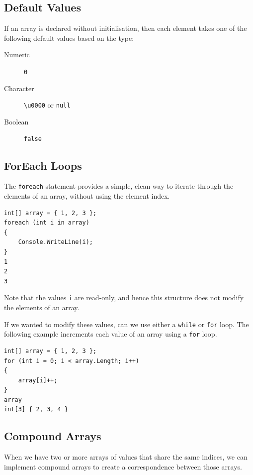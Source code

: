 \documentclass{article}
\def\customlinemarker#1#2{
    \edef\thelstnumber{%
        \unexpanded{%
            \ifnum#1=\value{lstnumber}\relax
              #2%
            \fi}%
        \ifx\thelstnumber\relax\else
        \expandafter\unexpanded\expandafter{\thelstnumber}%
        \fi
    }
}
\begin{document}
\subsection{Default Values}
If an array is declared without initialisation, then each element takes one of the following
default values based on the type:
\begin{description}
    \item[Numeric] \lstinline{0}
    \item[Character] \lstinline{\u0000} or \lstinline{null}
    \item[Boolean] \lstinline{false}
\end{description}
\subsection{ForEach Loops}
The \lstinline{foreach} statement provides a simple, clean way to iterate through the elements of an array,
without using the element index.
\begingroup
\let\thelstnumber\relax
\customlinemarker{1}{\$}
\customlinemarker{2}{\$}
\customlinemarker{3}{.}
\customlinemarker{4}{.}
\customlinemarker{5}{.}
\begin{lstlisting}
int[] array = { 1, 2, 3 };
foreach (int i in array)
{
    Console.WriteLine(i);
}
1
2
3    
\end{lstlisting}
\endgroup
Note that the values \lstinline{i} are read-only, and hence this structure
does not modify the elements of an array.

If we wanted to modify these values, can we use either a \lstinline{while} or
\lstinline{for} loop. The following example increments each value of an array
using a \lstinline{for} loop.
\begingroup
\let\thelstnumber\relax
\customlinemarker{1}{\$}
\customlinemarker{2}{\$}
\customlinemarker{3}{.}
\customlinemarker{4}{.}
\customlinemarker{5}{.}
\customlinemarker{6}{\$}
\begin{lstlisting}
int[] array = { 1, 2, 3 };
for (int i = 0; i < array.Length; i++)
{
    array[i]++;
}
array
int[3] { 2, 3, 4 }
\end{lstlisting}
\endgroup
\subsection{Compound Arrays}
When we have two or more arrays of values that share
the same indices, we can implement compound arrays to
create a correspondence between those arrays.
\end{document}
